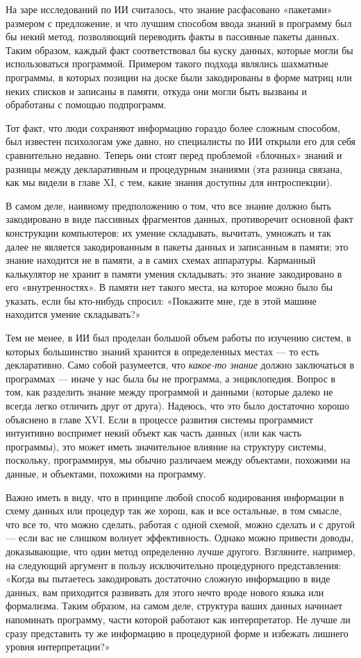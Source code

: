 На заре исследований по ИИ считалось, что знание расфасовано «пакетами» размером с предложение, и что лучшим способом ввода знаний в программу был бы некий метод, позволяющий переводить факты в пассивные пакеты данных. Таким образом, каждый факт соответствовал бы куску данных, которые могли бы использоваться программой. Примером такого подхода являлись шахматные программы, в которых позиции на доске были закодированы в форме матриц или неких списков и записаны в памяти, откуда они могли быть вызваны и обработаны с помощью подпрограмм.

Тот факт, что люди сохраняют информацию гораздо более сложным способом, был известен психологам уже давно, но специалисты по ИИ открыли его для себя сравнительно недавно. Теперь они стоят перед проблемой «блочных» знаний и разницы между декларативным и процедурным знаниями (эта разница связана, как мы видели в главе XI, с тем, какие знания доступны для интроспекции).

В самом деле, наивному предположению о том, что все знание должно быть закодировано в виде пассивных фрагментов данных, противоречит основной факт конструкции компьютеров: их умение складывать, вычитать, умножать и так далее не является закодированным в пакеты данных и записанным в памяти; это знание находится не в памяти, а в самих схемах аппаратуры. Карманный калькулятор не хранит в памяти умения складывать; это знание закодировано в его «внутренностях». В памяти нет такого места, на которое можно было бы указать, если бы кто-нибудь спросил: «Покажите мне, где в этой машине находится умение складывать?»

Тем не менее, в ИИ был проделан большой объем работы по изучению систем, в которых большинство знаний хранится в определенных местах --- то есть декларативно. Само собой разумеется, что \emph{какое-то знание} должно заключаться в программах --- иначе у нас была бы не программа, а энциклопедия. Вопрос в том, как разделить знание между программой и данными (которые далеко не всегда легко отличить друг от друга). Надеюсь, что это было достаточно хорошо объяснено в главе XVI. Если в процессе развития системы программист интуитивно воспримет некий объект как часть данных (или как часть программы), это может иметь значительное влияние на структуру системы, поскольку, программируя, мы обычно различаем между объектами, похожими на данные, и объектами, похожими на программу.

Важно иметь в виду, что в принципе любой способ кодирования информации в схему данных или процедур так же хорош, как и все остальные, в том смысле, что все то, что можно сделать, работая с одной схемой, можно сделать и с другой --- если вас не слишком волнует эффективность. Однако можно привести доводы, доказывающие, что один метод определенно лучше другого. Взгляните, например, на следующий аргумент в пользу исключительно процедурного представления: «Когда вы пытаетесь закодировать достаточно сложную информацию в виде данных, вам приходится развивать для этого нечто вроде нового языка или формализма. Таким образом, на самом деле, структура ваших данных начинает напоминать программу, части которой работают как интерпретатор. Не лучше ли сразу представить ту же информацию в процедурной форме и избежать лишнего уровня интерпретации?»

